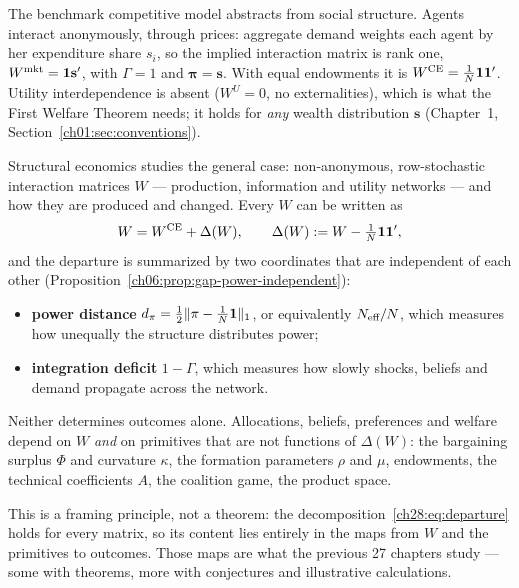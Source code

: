\documentclass[../structural_economics_book.tex]{subfiles}
\begin{document}
\begin{remark}\label{ch28:thm:general}
The benchmark competitive model abstracts from social structure. Agents interact anonymously, through prices: aggregate demand weights each agent by her expenditure share $s_i$, so the implied interaction matrix is rank one, $W^{\text{mkt}} = \mathbf{1}\mathbf{s}'$, with $\Gamma = 1$ and $\boldsymbol{\pi} = \mathbf{s}$. With equal endowments it is $W^{\text{CE}} = \frac{1}{N}\mathbf{1}\mathbf{1}'$. Utility interdependence is absent ($W^U = 0$, no externalities), which is what the First Welfare Theorem needs; it holds for \emph{any} wealth distribution $\mathbf{s}$ (Chapter~1, Section~\ref{ch01:sec:conventions}).

Structural economics studies the general case: non-anonymous, row-stochastic interaction matrices $W$ --- production, information and utility networks --- and how they are produced and changed. Every $W$ can be written as
\begin{equation}\label{ch28:eq:departure}
W = W^{\text{CE}} + \Delta(W), \qquad \Delta(W) := W - \tfrac{1}{N}\mathbf{1}\mathbf{1}',
\end{equation}
and the departure is summarized by two coordinates that are independent of each other (Proposition~\ref{ch06:prop:gap-power-independent}):
\begin{itemize}
\item \textbf{power distance} $d_\pi = \tfrac12\|\pi - \tfrac{1}{N}\mathbf{1}\|_1$, or equivalently $N_{\text{eff}}/N$, which measures how unequally the structure distributes power;
\item \textbf{integration deficit} $1 - \Gamma$, which measures how slowly shocks, beliefs and demand propagate across the network.
\end{itemize}
Neither determines outcomes alone. Allocations, beliefs, preferences and welfare depend on $W$ \emph{and} on primitives that are not functions of $\Delta(W)$: the bargaining surplus $\Phi$ and curvature $\kappa$, the formation parameters $\rho$ and $\mu$, endowments, the technical coefficients $A$, the coalition game, the product space.
\end{remark}

This is a framing principle, not a theorem: the decomposition~\eqref{ch28:eq:departure} holds for every matrix, so its content lies entirely in the maps from $W$ and the primitives to outcomes. Those maps are what the previous 27 chapters study --- some with theorems, more with conjectures and illustrative calculations.
\end{document}
